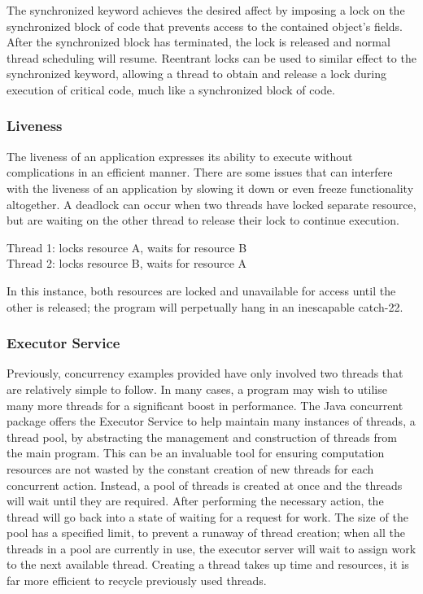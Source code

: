 \documentclass[a4paper,12pt]{article}
\begin{document}
The synchronized keyword achieves the desired affect by imposing a lock on the synchronized block of code that prevents access to the contained object’s fields. After the synchronized block has terminated, the lock is released and normal thread scheduling will resume. Reentrant locks can be used to similar effect to the synchronized keyword, allowing a thread to obtain and release a lock during execution of critical code, much like a synchronized block of code. 

\subsubsection{Liveness}
The liveness of an application expresses its ability to execute without complications in an efficient manner. There are some issues that can interfere with the liveness of an application by slowing it down or even freeze functionality altogether. A deadlock can occur when two threads have locked separate resource, but are waiting on the other thread to release their lock to continue execution. 

\vspace{2pt}
\begin{center}
\noindent Thread 1: locks resource A, waits for resource B
\\Thread 2: locks resource B, waits for resource A 
\end{center}
\vspace{2pt}

In this instance, both resources are locked and unavailable for access until the other is released; the program will perpetually hang in an inescapable catch-22.  


\subsubsection{Executor Service}
Previously, concurrency examples provided have only involved two threads that are relatively simple to follow. In many cases, a program may wish to utilise many more threads for a significant boost in performance. The Java concurrent package offers the Executor Service to help maintain many instances of threads, a thread pool, by abstracting the management and construction of threads from the main program. This can be an invaluable tool for ensuring computation resources are not wasted by the constant creation of new threads for each concurrent action. Instead, a pool of threads is created at once and the threads will wait until they are required. After performing the necessary action, the thread will go back into a state of waiting for a request for work. The size of the pool has a specified limit, to prevent a runaway of thread creation; when all the threads in a pool are currently in use, the executor server will wait to assign work to the next available thread. Creating a thread takes up time and resources, it is far more efficient to recycle previously used threads. 
\end{document}
